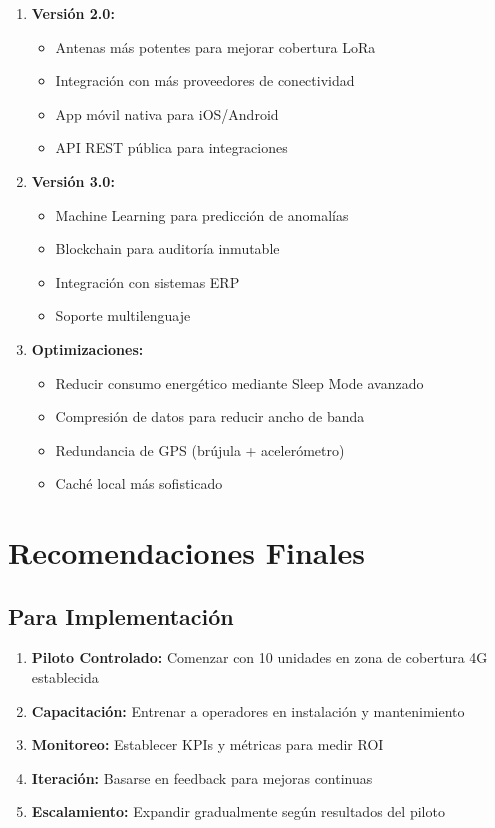 \documentclass[12pt,a4paper,oneside]{report}
\begin{document}
\begin{enumerate}
    \item \textbf{Versión 2.0:}
    \begin{itemize}
        \item Antenas más potentes para mejorar cobertura LoRa
        \item Integración con más proveedores de conectividad
        \item App móvil nativa para iOS/Android
        \item API REST pública para integraciones
    \end{itemize}
    
    \item \textbf{Versión 3.0:}
    \begin{itemize}
        \item Machine Learning para predicción de anomalías
        \item Blockchain para auditoría inmutable
        \item Integración con sistemas ERP
        \item Soporte multilenguaje
    \end{itemize}
    
    \item \textbf{Optimizaciones:}
    \begin{itemize}
        \item Reducir consumo energético mediante Sleep Mode avanzado
        \item Compresión de datos para reducir ancho de banda
        \item Redundancia de GPS (brújula + acelerómetro)
        \item Caché local más sofisticado
    \end{itemize}
\end{enumerate}

\section{Recomendaciones Finales}

\subsection{Para Implementación}

\begin{enumerate}
    \item \textbf{Piloto Controlado:} Comenzar con 10 unidades en zona de cobertura 4G establecida
    
    \item \textbf{Capacitación:} Entrenar a operadores en instalación y mantenimiento
    
    \item \textbf{Monitoreo:} Establecer KPIs y métricas para medir ROI
    
    \item \textbf{Iteración:} Basarse en feedback para mejoras continuas
    
    \item \textbf{Escalamiento:} Expandir gradualmente según resultados del piloto
\end{enumerate}
\end{document}
